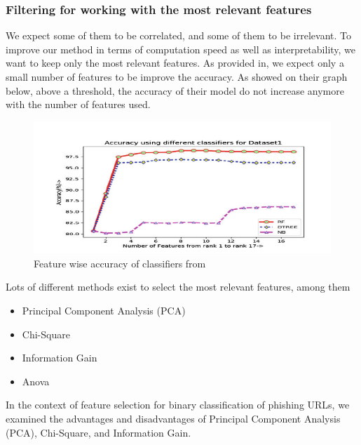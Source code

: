 \documentclass{article}
\begin{document}
    \subsubsection{Filtering for working with the most relevant features}

    We expect some of them to be correlated, and some of them to be irrelevant.
    To improve our method in terms of computation speed as well as interpretability, we want to keep only the most relevant features.
    As provided in\cite{LexicalFeatureSelection}, we expect only a small number of features to be improve the accuracy.
    As showed on their graph below, above a threshold, the accuracy of their model do not increase anymore with the number of features used.

    \begin{figure}[H]
        \centering
        \includegraphics{report_img/lexicalfeatureselectionaccuracygraph}
        \caption{Feature wise accuracy of classifiers from\cite{LexicalFeatureSelection}}
        \label{fig:}
    \end{figure}

    Lots of different methods exist to select the most relevant features, among them
    \begin{itemize}
        \item Principal Component Analysis (PCA)
        \item Chi-Square
        \item Information Gain
        \item Anova %
    \end{itemize}

    In the context of feature selection for binary classification of phishing URLs, we examined the advantages and disadvantages of Principal Component Analysis (PCA), Chi-Square, and Information Gain.
\end{document}
